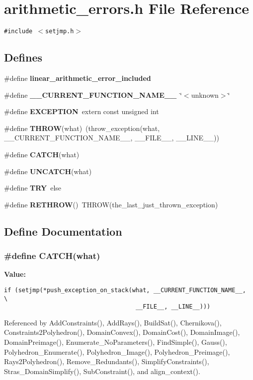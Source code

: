 \section{arithmetic\_\-errors.h File Reference}
\label{arithmetic__errors_8h}
{\tt \#include $<$setjmp.h$>$}\par
\subsection*{Defines}
\begin{CompactItemize}
\item 
\#define {\bf linear\_\-arithmetic\_\-error\_\-included}
\item 
\#define {\bf \_\-\_\-CURRENT\_\-FUNCTION\_\-NAME\_\-\_\-}\ \char`\"{}$<$unknown$>$\char`\"{}
\item 
\#define {\bf EXCEPTION}\ extern const unsigned int
\item 
\#define {\bf THROW}(what)\ (throw\_\-exception(what, \_\-\_\-CURRENT\_\-FUNCTION\_\-NAME\_\-\_\-, \_\-\_\-FILE\_\-\_\-, \_\-\_\-LINE\_\-\_\-))
\item 
\#define {\bf CATCH}(what)
\item 
\#define {\bf UNCATCH}(what)
\item 
\#define {\bf TRY}\ else
\item 
\#define {\bf RETHROW}()\ THROW(the\_\-last\_\-just\_\-thrown\_\-exception)
\end{CompactItemize}


\subsection{Define Documentation}
\subsubsection{\setlength{\rightskip}{0pt plus 5cm}\#define CATCH(what)}\label{arithmetic__errors_8h_a4}


{\bf Value:}

\footnotesize\begin{verbatim}if (setjmp(*push_exception_on_stack(what, __CURRENT_FUNCTION_NAME__,    \
                                     __FILE__, __LINE__)))\end{verbatim}\normalsize 


Referenced by Add\-Constraints(), Add\-Rays(), Build\-Sat(), Chernikova(), Constraints2Polyhedron(), Domain\-Convex(), Domain\-Cost(), Domain\-Image(), Domain\-Preimage(), Enumerate\_\-No\-Parameters(), Find\-Simple(), Gauss(), Polyhedron\_\-Enumerate(), Polyhedron\_\-Image(), Polyhedron\_\-Preimage(), Rays2Polyhedron(), Remove\_\-Redundants(), Simplify\-Constraints(), Stras\_\-Domain\-Simplify(), Sub\-Constraint(), and align\_\-context().

